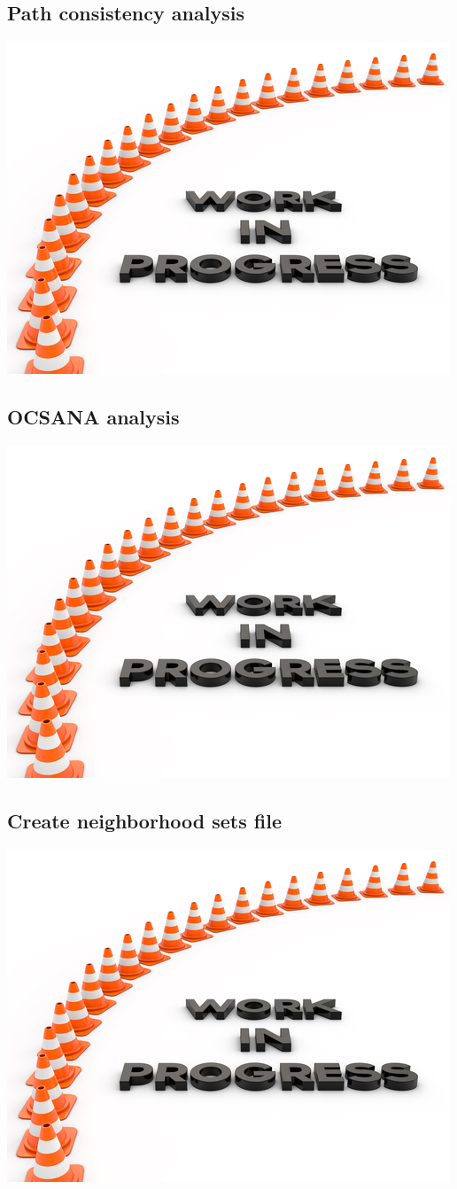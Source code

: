 \subsection{Path consistency analysis}
\includegraphics{graphics/work_in_progress}
\subsection{OCSANA analysis}
\includegraphics{graphics/work_in_progress}
\subsection{Create neighborhood sets file}
\includegraphics{graphics/work_in_progress}

